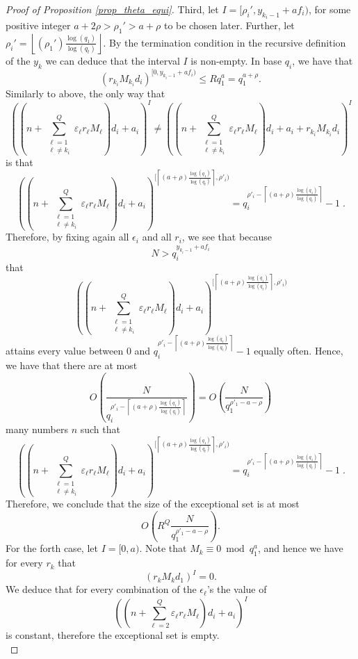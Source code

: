 \documentclass[12pt]{amsart}
\renewcommand{\leq}{\leqslant}
\theoremstyle{definition}
\numberwithin{equation}{section}
\numberwithin{equation}{section}
\begin{document}
\begin{proof}[Proof of Proposition \ref{prop_theta_equi}]
	Third, let $I=[\rho_i',y_{k_i-1}+af_i)$, for some positive integer $a+2\rho>\rho_1'>a+\rho$ to be chosen later. Further, let $\rho_i'= \left\lfloor(\rho_1')\frac{\log(q_1)}{\log(q_t)}\right\rfloor$. By the termination condition in the recursive definition of the $y_k$ we can deduce that the interval $I$ is non-empty. In base $q_i$, we have that
	\[
		(r_{k_i}M_{k_i}d_i)^{[0,y_{k_i-1}+af_i)} \leq Rq_1^{a} = q_1^{a+\rho}.
	\]
	Similarly to above, the only way that
	\[
		\left(\left(n+\sum_{\substack{\ell = 1\\\ell\neq k_i}}^{Q}\varepsilon_{\ell}r_{\ell}M_{\ell}\right)d_i+a_i\right)^{I}
				\neq
		\left(\left(n+\sum_{\substack{\ell = 1\\\ell\neq k_i}}^{Q}\varepsilon_{\ell}r_{\ell}M_{\ell}\right)d_i+a_i+r_{k_i}M_{k_i}d_i\right)^{I}
	\]	
	is that
	\[
		\left(\left(n+\sum_{\substack{\ell = 1\\\ell\neq k_i}}^{Q}\varepsilon_{\ell}r_{\ell}M_{\ell}\right) d_i +a_i\right)^{\Big[\left\lceil (a+\rho) \frac{\log(q_1)}{\log(q_t)} \right\rceil,\rho'_i\Big)} = q_i^{\rho'_i-\left\lceil (a+\rho) \frac{\log(q_1)}{\log(q_t)} \right\rceil}-1\;.
	\]
	Therefore, by fixing again all $\epsilon_i$ and all $r_i$, we see that because 
    \[
        N>q_i^{y_{k_i-1}+af_i}
    \]
    that
    \[
		\left(\left(n+\sum_{\substack{\ell = 1\\\ell\neq k_i}}^{Q}\varepsilon_{\ell}r_{\ell}M_{\ell}\right) d_i +a_i\right)^{\Big[\left\lceil (a+\rho) \frac{\log(q_1)}{\log(q_t)} \right\rceil,\rho'_i\Big)}
	\]
    attains every value between 0 and $q_i^{\rho'_i-\left\lceil (a+\rho) \frac{\log(q_1)}{\log(q_t)} \right\rceil}-1$ equally often. Hence, we have that there are at most
	\[
		O\left(\frac{N}{q_i^{\rho'_i-\left\lceil (a+\rho) \frac{\log(q_1)}{\log(q_t)} \right\rceil}}\right) = O\left(\frac{N}{q_1^{\rho'_1-a-\rho}}\right)
	\]
	many numbers $n$ such that
    	\[
		\left(\left(n+\sum_{\substack{\ell = 1\\\ell\neq k_i}}^{Q}\varepsilon_{\ell}r_{\ell}M_{\ell}\right) d_i +a_i\right)^{\Big[\left\lceil (a+\rho) \frac{\log(q_1)}{\log(q_t)} \right\rceil,\rho'_i\Big)} = q_i^{\rho'_i-\left\lceil (a+\rho) \frac{\log(q_1)}{\log(q_t)} \right\rceil}-1\;.
	\]
    Therefore, we conclude that the size of the exceptional set is at most
	\[
		O\left(R^Q\frac{N}{q_1^{\rho'_1-a-\rho}}\right).
	\]
	For the forth case, let $I=[0,a)$. Note that $M_k\equiv0\bmod q_1^a$, and hence we have for every $r_k$ that
	\[
		\left(r_kM_kd_1\right)^{I}=0.
	\]
	We deduce that for every combination of the $\epsilon_{\ell}$'s the value of
	\[
		\left(\left(n+\sum_{\ell = 2}^{Q}\varepsilon_{\ell}r_{\ell}M_{\ell}\right) d_i +a_i\right)^{I}
	\]
	is constant, therefore the exceptional set is empty.\\
	

\end{proof}
\end{document}
